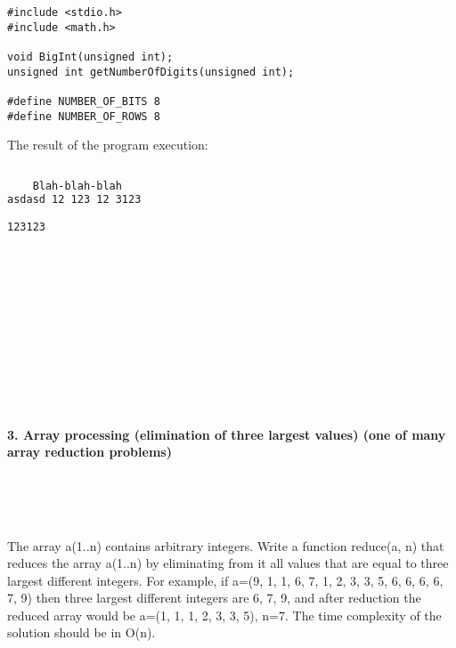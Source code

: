 \documentclass{article}
\begin{document}
	\begin{verbatim}
#include <stdio.h>
#include <math.h>

void BigInt(unsigned int);
unsigned int getNumberOfDigits(unsigned int);

#define NUMBER_OF_BITS 8
#define NUMBER_OF_ROWS 8
	\end{verbatim}
	
	
	\noindent The result of the program execution:
	
	\begin{lstlisting}[basicstyle=\fontsize{7}{9}\ttfamily, language=bash]%[basicstyle=\tiny, %or \small or \footnotesize etc.]
	
	Blah-blah-blah
asdasd 12 123 12 3123 

123123

	\end{lstlisting}
	
	
\paragraph{}\
\paragraph{}\
\paragraph{}\
\paragraph{}\
\paragraph{}\


	
	\rmfamily
	
	\paragraph{3. Array processing (elimination of three largest values) (one of many array reduction problems) }\
	
	\rmfamily\
	
		The array a(1..n) contains arbitrary integers. Write a function reduce(a, n) that reduces the array a(1..n) by eliminating from it all values that are equal to three largest different integers. For example, if a=(9, 1, 1, 6, 7, 1, 2, 3, 3, 5, 6, 6, 6, 6, 7, 9) then three largest different integers are 6, 7, 9, and after reduction the reduced array would be a=(1, 1, 1, 2, 3, 3, 5), n=7. The time complexity of the solution should be in O(n). 
		\newline
		
\end{document}
